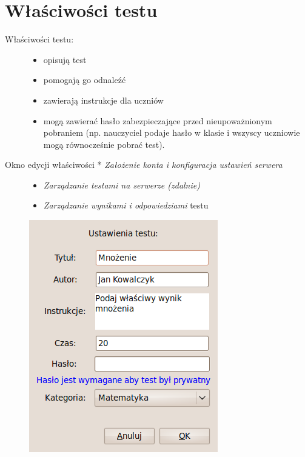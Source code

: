 \documentclass[letterpaper,10pt,polish]{sphinxmanual}
\begin{document}
\section{Właściwości testu}
\label{index:id5}\label{index:wlasciwosci-testu}\begin{description}
\item[{Właściwości testu:}] \leavevmode\begin{itemize}
\item {} 
opisują test

\item {} 
pomogają go odnaleźć

\item {} 
zawierają instrukcje dla uczniów

\item {} 
mogą zawierać hasło zabezpieczające przed nieupoważnionym pobraniem (np. nauczyciel podaje hasło w klasie i wszyscy uczniowie mogą równocześnie pobrać test).

\end{itemize}

\item[{Okno edycji właściwości * \emph{Założenie konta i konfiguracja ustawień serwera}}] \leavevmode\begin{itemize}
\item {} 
\emph{Zarządzanie testami na serwerze (zdalnie)}

\item {} 
\emph{Zarządzanie wynikami i odpowiedziami} testu

\end{itemize}

\includegraphics{WlasciwosciTestu.png}

\end{description}
\end{document}
